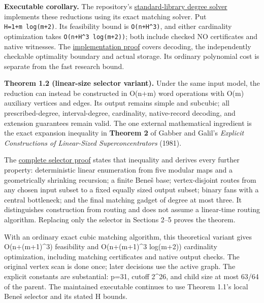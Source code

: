 \textbf{Executable corollary.} The repository's \href{https://github.com/icekylinx/algorithm-frontier/blob/main/problems/degree-constrained-subgraphs/reference/README.md}{standard-library degree solver} implements these reductions using its exact matching solver. Put \texttt{H=1+m\ log(m+2)}. Its feasibility bound is \texttt{O(n+H\^{}3)}, and either cardinality optimization takes \texttt{O(n+H\^{}3\ log(m+2))}; both include checked NO certificates and native witnesses. The \href{https://github.com/icekylinx/algorithm-frontier/blob/main/problems/degree-constrained-subgraphs/reference/correctness.md}{implementation proof} covers decoding, the independently checkable optimality boundary and actual storage. Its ordinary polynomial cost is separate from the fast research bound.

\textbf{Theorem 1.2 (linear-size selector variant).} Under the same input model, the reduction can instead be constructed in O(n+m) word operations with O(m) auxiliary vertices and edges. Its output remains simple and subcubic; all prescribed-degree, interval-degree, cardinality, native-record decoding, and extension guarantees remain valid. The one external mathematical ingredient is the exact expansion inequality in \textbf{Theorem 2} of Gabber and Galil's \emph{Explicit Constructions of Linear-Sized Superconcentrators} (1981).

The \href{https://github.com/icekylinx/algorithm-frontier/blob/main/problems/degree-constrained-subgraphs/linear-selector.md}{complete selector proof} states that inequality and derives every further property: deterministic linear enumeration from five modular maps and a geometrically shrinking recursion; a finite Beneš base; vertex-disjoint routes from any chosen input subset to a fixed equally sized output subset; binary fans with a central bottleneck; and the final matching gadget of degree at most three. It distinguishes construction from routing and does not assume a linear-time routing algorithm. Replacing only the selector in Sections 2--5 proves the theorem.

With an ordinary exact cubic matching algorithm, this theoretical variant gives O(n+(m+1)\^{}3) feasibility and O(n+(m+1)\^{}3 log(m+2)) cardinality optimization, including matching certificates and native output checks. The original vertex scan is done once; later decisions use the active graph. The explicit constants are substantial: p=31, cutoff 2\^{}26, and child size at most 63/64 of the parent. The maintained executable continues to use Theorem 1.1's local Beneš selector and its stated H bounds.

